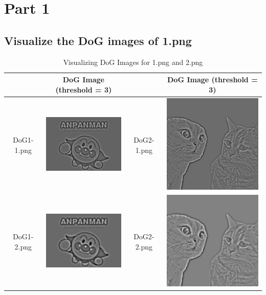 \documentclass[a4paper, 12pt]{article}
\begin{document}
\section{Part 1}
\subsection{Visualize the DoG images of 1.png}
\begin{table}[!htb]
    \centering
    \caption{Visualizing DoG Images for 1.png and 2.png}
    \begin{tabular}{|c|c|c|c|}
        \hline
                   & DoG Image (threshold = 3)                           &            & DoG Image (threshold = 3)                             \\
        \hline
        DoG1-1.png & \includegraphics[scale=1]{part1/result/DoG_1_1.png} & DoG2-1.png & \includegraphics[scale=0.6]{part1/result/DoG_2_1.png} \\
        \hline
        DoG1-2.png & \includegraphics[scale=1]{part1/result/DoG_1_2.png} & DoG2-2.png & \includegraphics[scale=0.6]{part1/result/DoG_2_2.png} \\

\end{tabular}
\end{table}
\end{document}
